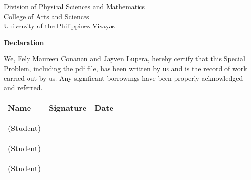 \begin{center}
	Division of Physical Sciences and Mathematics\\
	College of Arts and Sciences\\
	University of the Philippines Visayas 
	
		\textbf{Declaration}
		\end{center}

We,  Fely Maureen Conanan and Jayven Lupera, hereby certify that this Special Problem, including the pdf file, has been written by us  and is the record of work carried out by us. Any significant borrowings have been properly acknowledged and referred.

	\begin{tabular}{lll}
	\bfseries Name  & \bfseries Signature & \bfseries Date\\ \\
	\signaturerule &\signaturerule  & \signaturerule\\ 
	(Student)\\ \\
	\signaturerule &\signaturerule &\signaturerule\\
	(Student)\\ \\
	\signaturerule &\signaturerule &\signaturerule\\
	(Student)
\end{tabular}



